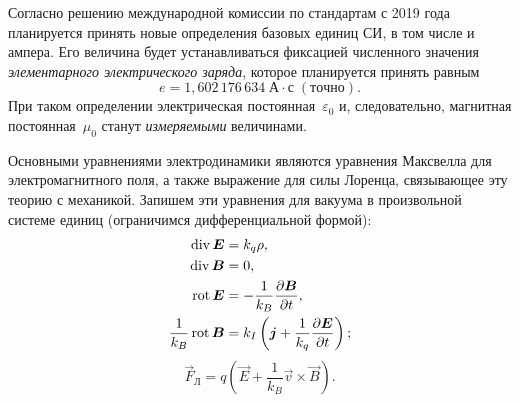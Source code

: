 \begin{lab:note}
Согласно решению международной комиссии по стандартам с 2019 года
планируется принять новые определения базовых единиц СИ, в том числе и ампера.
Его величина будет устанавливаться фиксацией численного значения
\emph{элементарного электрического заряда}, которое
планируется принять равным
\[
e = 1,602\,176\,634\;\text{А}\cdot\text{с}\;(точно).
\]
При таком определении электрическая постоянная~$\varepsilon_0$ и, следовательно,
магнитная постоянная~$\mu_0$ станут \emph{измеряемыми} величинами.
\end{lab:note}


Основными уравнениями электродинамики являются уравнения Максвелла
для электромагнитного поля, а также выражение для силы Лоренца, связывающее
эту теорию с механикой. Запишем эти уравнения для вакуума в произвольной
системе единиц (ограничимся дифференциальной формой):
\begin{align}
\mathop{\mathrm{div}} {\boldsymbol{E}} & =k_{q}\rho,\label{eq:gauss}\\
\mathop{\mathrm{div}} {\boldsymbol{B}} & =0,\\
\mathop{\mathrm{rot}} {\boldsymbol{E}} & =-\frac{1}{k_{B}}\frac{\partial{\boldsymbol{B}}}{\partial t},\label{eq:faradey}\\
\frac{1}{k_B}\mathop{\mathrm{rot}} {\boldsymbol{B}} & =k_{I}\left({\boldsymbol{j}}+\frac{1}{k_{q}}\frac{\partial{\boldsymbol{E}}}{\partial t}\right);\label{eq:ampere-dif}
\end{align}
\begin{equation}
\vec{F}_Л=q\left(\vec{E}+\frac{1}{k_{B}}\vec{v}\times\vec{B}\right).\label{eq:lorentz}
\end{equation}

